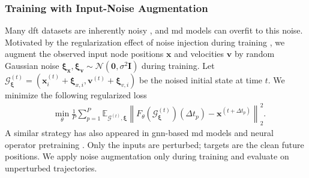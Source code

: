 \subsubsection{Training with Input-Noise Augmentation}
\label{sec:label_noise}
Many \gls{dft} datasets are inherently noisy \cite{christensen_role_2020}, and \gls{md} models can overfit to this noise. Motivated by the regularization effect of noise injection during training \cite{damian_label_2021,haochen_shape_2020}, we augment the observed input node positions \(\mathbf{x}\) and velocities \(\mathbf{v}\) by random Gaussian noise \(\boldsymbol{\xi}_\mathbf{x}, \boldsymbol{\xi}_\mathbf{v} \sim \mathcal{N}(\mathbf{0}, \sigma^2 \mathbf{I})\) during training. 
Let ${\mathcal{G}}^{(t)}_{\boldsymbol{\xi}} = ( \mathbf x_i^{(t)} + \boldsymbol{\xi}_{x, i}, \mathbf v^{(t)} + \boldsymbol{\xi}_{v,i})$ be the noised initial state at time $t$. We minimize the following regularized loss
\begin{align*}
    &\min_{\theta} \frac{1}{P} \sum_{p=1}^P \mathbb{E}_{ 
            \mathcal{G}^{(t)}, \boldsymbol{\xi}} 
         \left\|
            F_\theta\left( \mathcal{G}^{(t)}_{\boldsymbol{\xi}}   \right)(\Delta t_p) - \mathbf{x}^{(t+ \Delta t_p) }
        \right\|_{2}^{2}.
\end{align*}
A similar strategy has also appeared in \gls{gnn}-based  \gls{md} models and neural operator pretraining \cite{dauparas_robust_2022, zhou_strategies_2024, hao_dpot_2024}. 
Only the inputs are perturbed; targets are the clean future positions. We apply noise augmentation only during training and evaluate on unperturbed trajectories.



